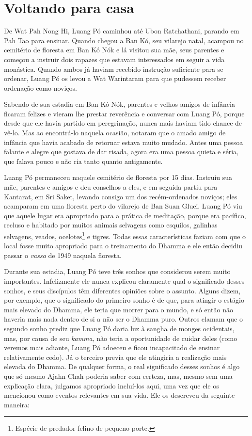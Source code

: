 \chapter{Voltando para casa}

De Wat Pah Nong Hi, Luang Pó caminhou até Ubon Ratchathani, parando em
Pah Tao para ensinar. Quando chegou a Ban Kó, seu vilarejo natal,
acampou no cemitério de floresta em Ban Kó Nók e lá visitou sua mãe,
seus parentes e começou a instruir dois rapazes que estavam interessados
em seguir a vida monástica. Quando ambos já haviam recebido instrução
suficiente para se ordenar, Luang Pó os levou a Wat Warintaram para que
pudessem receber ordenação como noviços.

Sabendo de sua estadia em Ban Kó Nók, parentes e velhos amigos de
infância ficaram felizes e vieram lhe prestar reverência e conversar com
Luang Pó, porque desde que ele havia partido em peregrinação, nunca mais
haviam tido chance de vê-lo. Mas ao encontrá-lo naquela ocasião, notaram
que o amado amigo de infância que havia acabado de retornar estava muito
mudado. Antes uma pessoa falante e alegre que gostava de dar risada,
agora era uma pessoa quieta e séria, que falava pouco e não ria tanto
quanto antigamente.

Luang Pó permaneceu naquele cemitério de floresta por 15 dias. Instruiu
sua mãe, parentes e amigos e deu conselhos a eles, e em seguida partiu
para Kantarat, em Sri Saket, levando consigo um dos recém-ordenados
noviços; eles acamparam em uma floresta perto do vilarejo de Ban Suan
Gluei. Luang Pó viu que aquele lugar era apropriado para a prática de
meditação, porque era pacífico, recluso e habitado por muitos animais
selvagens como esquilos, galinhas selvagens, veados, ocelotes\footnote{Espécie
  de predador felino de pequeno porte.} e tigres. Todas essas
características faziam com que o local fosse muito apropriado para o
treinamento do Dhamma e ele então decidiu passar o \emph{vassa} de 1949
naquela floresta.

Durante sua estadia, Luang Pó teve três sonhos que considerou serem
muito importantes. Infelizmente ele nunca explicou claramente qual o
significado desses sonhos, e seus discípulos têm diferentes opiniões
sobre o assunto. Alguns dizem, por exemplo, que o significado do
primeiro sonho é de que, para atingir o estágio mais elevado do Dhamma,
ele teria que morrer para o mundo, e só então não haveria mais nada
dentro de si a não ser o Dhamma puro. Outros clamam que o segundo sonho
prediz que Luang Pó daria luz à sangha de monges ocidentais, mas, por
causa de seu \emph{kamma}, não teria a oportunidade de cuidar deles
(como veremos mais adiante, Luang Pó adoeceu e ficou incapacitado de
ensinar relativamente cedo). Já o terceiro previa que ele atingiria a
realização mais elevada do Dhamma. De qualquer forma, o real significado
desses sonhos é algo que só mesmo Ajahn Chah poderia saber com certeza,
mas, mesmo sem uma explicação clara, julgamos apropriado incluí-los
aqui, uma vez que ele os mencionou como eventos relevantes em sua vida.
Ele os descreveu da seguinte maneira:

